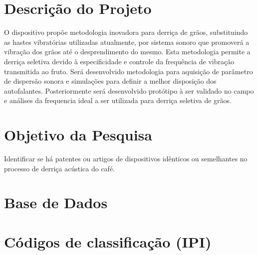 
\chapter{Descrição do Projeto}
\label{chap:descricao-projeto}


O dispositivo propõe metodologia inovadora para derriça de grãos, substituindo as hastes vibratórias utilizadas atualmente, por sistema sonoro que promoverá a vibração dos grãos até o desprendimento do mesmo. Esta metodologia permite a derriça seletiva devido à especificidade e controle da frequência de vibração transmitida ao fruto. Será desenvolvido metodologia para aquisição de parâmetro de dispersão sonora e simulações para definir a melhor disposição dos autofalantes. Posteriormente será desenvolvido protótipo à ser validado no campo e análises da frequencia ideal a ser utilizada para derriça seletiva de grãos.

\chapter{Objetivo da Pesquisa}
\label{chap:objetivo-pesquisa}

Identificar se há patentes ou artigos de dispositivos idênticos ou semelhantes no processo de derriça acústica do café.

\chapter{Base de Dados}
\label{chap:base-dados}

\begin{BaseDados}
\end{BaseDados}

\chapter{Códigos de classificação (IPI)}
\label{chap:codigos-classificacao}

\begin{CodigoClassIPC}
\end{CodigoClassIPC}

